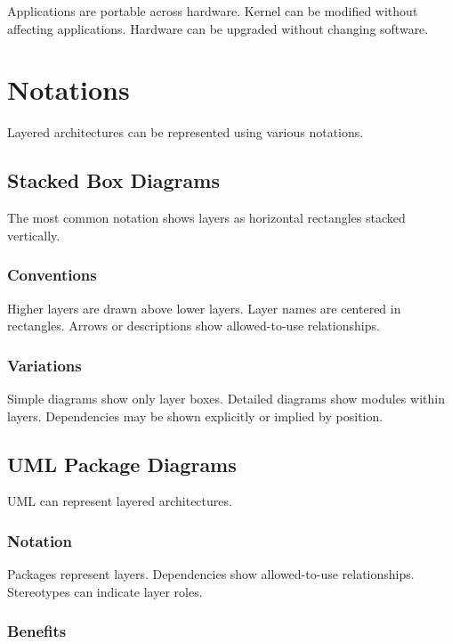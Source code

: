 \documentclass[11pt]{article}
\begin{document}
Applications are portable across hardware. Kernel can be modified without affecting applications. Hardware can be upgraded without changing software.

\section{Notations}

Layered architectures can be represented using various notations.

\subsection{Stacked Box Diagrams}

The most common notation shows layers as horizontal rectangles stacked vertically.

\subsubsection{Conventions}

Higher layers are drawn above lower layers. Layer names are centered in rectangles. Arrows or descriptions show allowed-to-use relationships.

\subsubsection{Variations}

Simple diagrams show only layer boxes. Detailed diagrams show modules within layers. Dependencies may be shown explicitly or implied by position.

\subsection{UML Package Diagrams}

UML can represent layered architectures.

\subsubsection{Notation}

Packages represent layers. Dependencies show allowed-to-use relationships. Stereotypes can indicate layer roles.

\subsubsection{Benefits}
\end{document}
